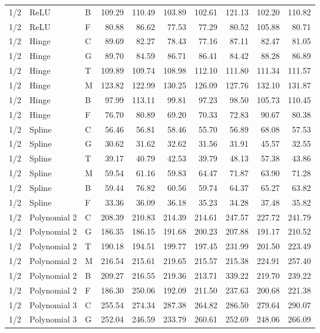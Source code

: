 \begin{longtable}{lllrrrrrrr}
1/2 & ReLU & B & 109.29 & 110.49 & 103.89 & 102.61 & 121.13 & 102.20 & 110.82 \\
1/2 & ReLU & F & 80.88 & 86.62 & 77.53 & 77.29 & 80.52 & 105.88 & 80.71 \\
1/2 & Hinge & C & 89.69 & 82.27 & 78.43 & 77.16 & 87.11 & 82.47 & 81.05 \\
1/2 & Hinge & G & 89.70 & 84.59 & 86.71 & 86.41 & 84.42 & 88.28 & 86.89 \\
1/2 & Hinge & T & 109.89 & 109.74 & 108.98 & 112.10 & 111.80 & 111.34 & 111.57 \\
1/2 & Hinge & M & 123.82 & 122.99 & 130.25 & 126.09 & 127.76 & 132.10 & 131.87 \\
1/2 & Hinge & B & 97.99 & 113.11 & 99.81 & 97.23 & 98.50 & 105.73 & 110.45 \\
1/2 & Hinge & F & 76.70 & 80.89 & 69.20 & 70.33 & 72.83 & 90.67 & 80.38 \\
1/2 & Spline & C & 56.46 & 56.81 & 58.46 & 55.70 & 56.89 & 68.08 & 57.53 \\
1/2 & Spline & G & 30.62 & 31.62 & 32.62 & 31.56 & 31.91 & 45.57 & 32.55 \\
1/2 & Spline & T & 39.17 & 40.79 & 42.53 & 39.79 & 48.13 & 57.38 & 43.86 \\
1/2 & Spline & M & 59.54 & 61.16 & 59.83 & 64.47 & 71.87 & 63.90 & 71.28 \\
1/2 & Spline & B & 59.44 & 76.82 & 60.56 & 59.74 & 64.37 & 65.27 & 63.82 \\
1/2 & Spline & F & 33.36 & 36.09 & 36.18 & 35.23 & 34.28 & 37.48 & 35.82 \\
1/2 & Polynomial 2 & C & 208.39 & 210.83 & 214.39 & 214.61 & 247.57 & 227.72 & 241.79 \\
1/2 & Polynomial 2 & G & 186.35 & 186.15 & 191.68 & 200.23 & 207.88 & 191.17 & 210.52 \\
1/2 & Polynomial 2 & T & 190.18 & 194.51 & 199.77 & 197.45 & 231.99 & 201.50 & 223.49 \\
1/2 & Polynomial 2 & M & 216.54 & 215.61 & 219.65 & 215.57 & 215.38 & 224.91 & 257.40 \\
1/2 & Polynomial 2 & B & 209.27 & 216.55 & 219.36 & 213.71 & 339.22 & 219.70 & 239.22 \\
1/2 & Polynomial 2 & F & 186.30 & 250.06 & 192.09 & 211.50 & 237.63 & 200.68 & 221.38 \\
1/2 & Polynomial 3 & C & 255.54 & 274.34 & 287.38 & 264.82 & 286.50 & 279.64 & 290.07 \\
1/2 & Polynomial 3 & G & 252.04 & 246.59 & 233.79 & 260.61 & 252.69 & 248.06 & 266.09 \\

\end{longtable}
